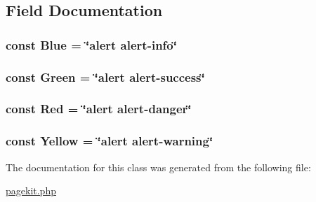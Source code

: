 \subsection{Field Documentation}
\hypertarget{class_color_a3fe2e9935cc0f170c80afcf219c9b72d}{
\subsubsection[{Blue}]{\setlength{\rightskip}{0pt plus 5cm}const Blue = \char`\"{}alert alert-\/info\char`\"{}}}\label{class_color_a3fe2e9935cc0f170c80afcf219c9b72d}
\hypertarget{class_color_ac119844ee984b491286742de94976fa3}{
\subsubsection[{Green}]{\setlength{\rightskip}{0pt plus 5cm}const Green = \char`\"{}alert alert-\/success\char`\"{}}}\label{class_color_ac119844ee984b491286742de94976fa3}
\hypertarget{class_color_ad3fcb7b82c3f5eb778db8c50e4f6650c}{
\subsubsection[{Red}]{\setlength{\rightskip}{0pt plus 5cm}const Red = \char`\"{}alert alert-\/danger\char`\"{}}}\label{class_color_ad3fcb7b82c3f5eb778db8c50e4f6650c}
\hypertarget{class_color_a0c6b6d8bcb388ac24174b8a8e8910d4d}{
\subsubsection[{Yellow}]{\setlength{\rightskip}{0pt plus 5cm}const Yellow = \char`\"{}alert alert-\/warning\char`\"{}}}\label{class_color_a0c6b6d8bcb388ac24174b8a8e8910d4d}


The documentation for this class was generated from the following file\-:\begin{DoxyCompactItemize}
\item 
\hyperlink{pagekit_8php}{pagekit.\-php}\end{DoxyCompactItemize}

